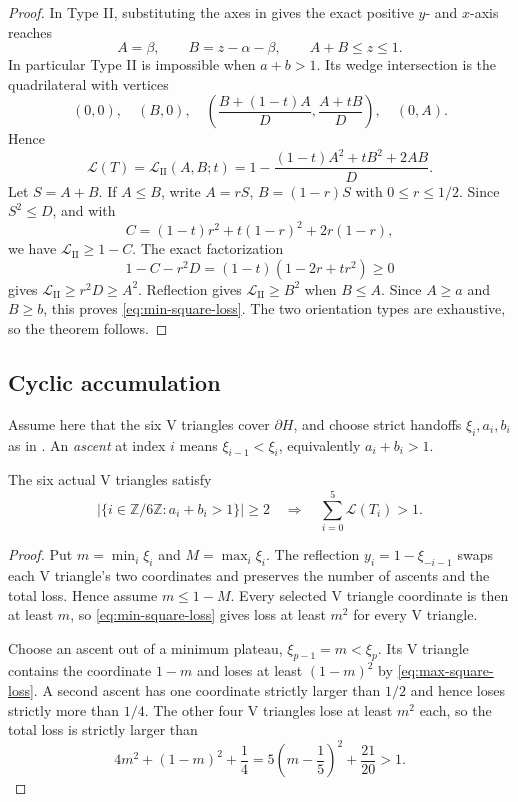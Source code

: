 \begin{proof}
In Type II, substituting the axes in  gives
the exact positive $y$- and $x$-axis reaches
\begin{equation}
 A=\beta,\qquad B=z-\alpha-\beta,\qquad A+B\le z\le1.
 \label{eq:area-type-II-reaches}
\end{equation}
In particular Type II is impossible when $a+b>1$.  Its wedge intersection
is the quadrilateral with vertices
\[
 (0,0),\quad(B,0),\quad
 \left(\frac{B+(1-t)A}{D},\frac{A+tB}{D}\right),
 \quad(0,A).
\]
Hence
\begin{equation}
 \mathcal L(T)=\mathcal L_{\mathrm{II}}(A,B;t)
 =1-\frac{(1-t)A^2+tB^2+2AB}{D}.              \label{eq:type-II-loss}
\end{equation}
Let $S=A+B$.  If $A\le B$, write $A=rS$, $B=(1-r)S$ with
$0\le r\le1/2$.  Since $S^2\le D$, and with
\[
 C=(1-t)r^2+t(1-r)^2+2r(1-r),
\]
we have $\mathcal L_{\mathrm{II}}\ge1-C$.  The exact factorization
\[
 1-C-r^2D=(1-t)(1-2r+tr^2)\ge0
\]
gives $\mathcal L_{\mathrm{II}}\ge r^2D\ge A^2$.  Reflection gives
$\mathcal L_{\mathrm{II}}\ge B^2$ when $B\le A$.  Since $A\ge a$ and $B\ge b$,
this proves \eqref{eq:min-square-loss}.  The two orientation types are
exhaustive, so the theorem follows.
\end{proof}

\subsection{Cyclic accumulation}

Assume here that the six V triangles cover $\partial H$, and choose
strict handoffs $\xi_i,a_i,b_i$ as in .
An \emph{ascent} at index $i$ means $\xi_{i-1}<\xi_i$, equivalently
$a_i+b_i>1$.

\begin{lemma}
\label{lem:cyclic-area-loss}
The six actual V triangles satisfy
\[
 \left|\{i\in\mathbb Z/6\mathbb Z:a_i+b_i>1\}\right|\ge2
 \quad\Longrightarrow\quad
 \sum_{i=0}^5\mathcal L(T_i)>1.
\]
\end{lemma}

\begin{proof}
Put $m=\min_i \xi_i$ and $M=\max_i \xi_i$.  The reflection
$y_i=1-\xi_{-i-1}$ swaps each V triangle's two coordinates and preserves the number of ascents and the total loss.  Hence assume $m\le1-M$.  Every selected
V triangle coordinate is then at least $m$, so
\eqref{eq:min-square-loss} gives loss at least $m^2$ for every V triangle.

Choose an ascent out of a minimum plateau,
$\xi_{p-1}=m<\xi_p$.  Its V triangle contains the coordinate $1-m$ and loses at least
$(1-m)^2$ by \eqref{eq:max-square-loss}.  A second ascent has one coordinate
strictly larger than $1/2$ and hence loses strictly more than $1/4$.  The
other four V triangles lose at least $m^2$ each, so the total loss is strictly
larger than
\[
 4m^2+(1-m)^2+\frac14
 =5\left(m-\frac15\right)^2+\frac{21}{20}>1.
\]

\end{proof}

